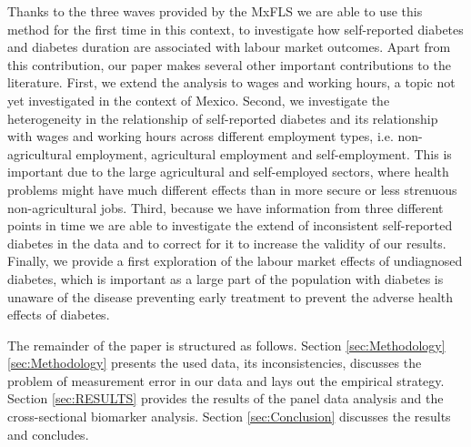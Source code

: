 Thanks to the three waves provided by the \ac{MxFLS} we are able
to use this method for the first time in this context, to investigate
how self-reported diabetes and diabetes duration are associated with
labour market outcomes. Apart from this contribution, our paper makes
several other important contributions to the literature. First, we
extend the analysis to wages and working hours, a topic not yet investigated
in the context of Mexico. Second, we investigate the heterogeneity
in the relationship of self-reported diabetes and its relationship
with wages and working hours across different employment types, i.e.
non-agricultural employment, agricultural employment and self-employment.
This is important due to the large agricultural and self-employed
sectors, where health problems might have much different effects than
in more secure or less strenuous non-agricultural jobs. Third, because
we have information from three different points in time we are able
to investigate the extend of inconsistent self-reported diabetes in
the data and to correct for it to increase the validity of our results.
Finally, we provide a first exploration of the labour market effects
of undiagnosed diabetes, which is important as a large part of the
population with diabetes is unaware of the disease preventing early
treatment to prevent the adverse health effects of diabetes.

The remainder of the paper is structured as follows. Section \ref{sec:Methodology}\ref{sec:Methodology}
presents the used data, its inconsistencies, discusses the problem
of measurement error in our data and lays out the empirical strategy.
Section \ref{sec:RESULTS} provides the results of the panel data
analysis and the cross-sectional biomarker analysis. Section \ref{sec:Conclusion}
discusses the results and concludes.
  
  
  
  
  
  
  
  
  
  
  
  
  
  
  
  
  
  
  
  
  
  
  
  
  
  
  
  
  
  
  
  
  
  
  
  
  
  
  
  